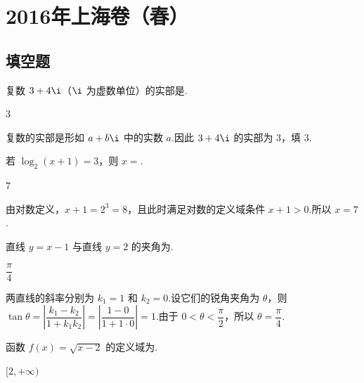\chapter{2016年上海卷（春）}

\section{填空题}

\begin{problem}
复数 \(3+4\i\)（\(\i\) 为虚数单位）的实部是\fillinblank{}.
\end{problem}

\begin{answer}
\(3\)
\end{answer}

\begin{solution}
复数的实部是形如 \(a+b\i\) 中的实数 \(a\).因此 \(3+4\i\) 的实部为 \(3\)，填 \(3\).
\end{solution}

\begin{problem}
若 \(\log_2(x+1)=3\)，则 \(x=\)\fillinblank{}.
\end{problem}

\begin{answer}
\(7\)
\end{answer}

\begin{solution}
由对数定义，\(x+1=2^3=8\)，且此时满足对数的定义域条件 \(x+1>0\).所以 \(x=7\).
\end{solution}

\begin{problem}
直线 \(y=x-1\) 与直线 \(y=2\) 的夹角为\fillinblank{}.
\end{problem}

\begin{answer}
\(\dfrac{\pi}{4}\)
\end{answer}

\begin{solution}
两直线的斜率分别为 \(k_1=1\) 和 \(k_2=0\).设它们的锐角夹角为 \(\theta\)，则
\(\tan\theta=\left|\dfrac{k_1-k_2}{1+k_1k_2}\right|=\left|\dfrac{1-0}{1+1\cdot0}\right|=1\).由于 \(0<\theta<\dfrac{\pi}{2}\)，所以 \(\theta=\dfrac{\pi}{4}\).
\end{solution}

\begin{problem}
函数 \(f(x)=\sqrt{x-2}\) 的定义域为\fillinblank{}.
\end{problem}

\begin{answer}
\([2,+\infty)\)
\end{answer}


